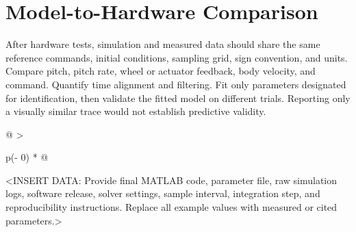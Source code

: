 \section{Model-to-Hardware Comparison}\label{model-to-hardware-comparison}

After hardware tests, simulation and measured data should share the same
reference commands, initial conditions, sampling grid, sign convention,
and units. Compare pitch, pitch rate, wheel or actuator feedback, body
velocity, and command. Quantify time alignment and filtering. Fit only
parameters designated for identification, then validate the fitted model
on different trials. Reporting only a visually similar trace would not
establish predictive validity.

\begin{longtable}[]{@{}
  >{\raggedright\arraybackslash}p{(\columnwidth - 0\tabcolsep) * }@{}}
\toprule\noalign{}
\begin{minipage}[b]{\linewidth}\raggedright
\textless INSERT DATA: Provide final MATLAB code, parameter file, raw
simulation logs, software release, solver settings, sample interval,
integration step, and reproducibility instructions. Replace all example
values with measured or cited parameters.\textgreater{}
\end{minipage} \\
\midrule\noalign{}
\endhead
\bottomrule\noalign{}
\endlastfoot
\end{longtable}
